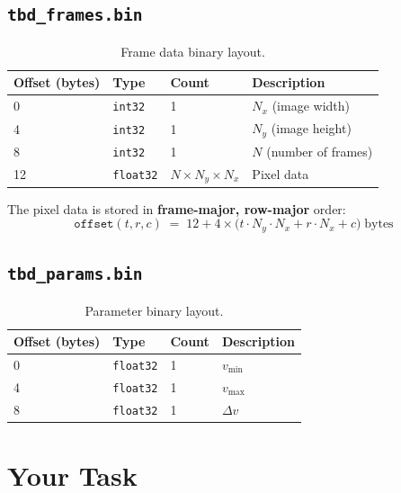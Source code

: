 \documentclass[11pt,letterpaper]{article}
\begin{document}
\subsection{\texttt{tbd\_frames.bin}}

\begin{table}[h]
\centering
\caption{Frame data binary layout.}
\begin{tabular}{@{}llll@{}}
\toprule
\textbf{Offset (bytes)} & \textbf{Type} & \textbf{Count} & \textbf{Description} \\
\midrule
0    & \texttt{int32}   & 1   & $N_x$ (image width) \\
4    & \texttt{int32}   & 1   & $N_y$ (image height) \\
8    & \texttt{int32}   & 1   & $N$ (number of frames) \\
12   & \texttt{float32} & $N \times N_y \times N_x$ & Pixel data \\
\bottomrule
\end{tabular}
\end{table}

\noindent The pixel data is stored in \textbf{frame-major, row-major} order:
\begin{equation}
    \texttt{offset}(t, r, c) \;=\; 12 + 4 \times \bigl(t \cdot N_y \cdot N_x + r \cdot N_x + c\bigr) \;\text{bytes}
\end{equation}

\subsection{\texttt{tbd\_params.bin}}

\begin{table}[h]
\centering
\caption{Parameter binary layout.}
\begin{tabular}{@{}llll@{}}
\toprule
\textbf{Offset (bytes)} & \textbf{Type} & \textbf{Count} & \textbf{Description} \\
\midrule
0  & \texttt{float32} & 1 & $v_{\min}$ \\
4  & \texttt{float32} & 1 & $v_{\max}$ \\
8  & \texttt{float32} & 1 & $\Delta v$ \\
\bottomrule
\end{tabular}
\end{table}

\section{Your Task}
\label{sec:task}
\end{document}
